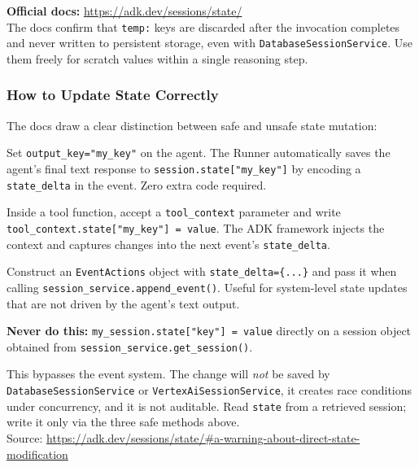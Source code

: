 \documentclass[12pt, a4paper]{article}
\begin{document}
\begin{theorybox}
\begin{notebox}
\textbf{Official docs:} \url{https://adk.dev/sessions/state/}\\
The docs confirm that \texttt{temp:} keys are discarded after the invocation
completes and never written to persistent storage, even with
\texttt{DatabaseSessionService}. Use them freely for scratch values within a
single reasoning step.
\end{notebox}

\subsubsection*{How to Update State Correctly}

The docs draw a clear distinction between safe and unsafe state mutation:

\begin{description}[leftmargin=4cm, style=nextline, font=\bfseries\color{keyterm}]
  \item[output\_key (easiest)] Set \texttt{output\_key="my\_key"} on the agent. The
    Runner automatically saves the agent's final text response to
    \texttt{session.state["my\_key"]} by encoding a \texttt{state\_delta} in the
    event. Zero extra code required.

  \item[ToolContext.state (in tools)] Inside a tool function, accept a
    \texttt{tool\_context} parameter and write
    \texttt{tool\_context.state["my\_key"] = value}. The ADK framework injects the
    context and captures changes into the next event's \texttt{state\_delta}.

  \item[EventActions.state\_delta (manual)] Construct an \texttt{EventActions} object
    with \texttt{state\_delta=\{...\}} and pass it when calling
    \texttt{session\_service.append\_event()}. Useful for system-level state updates
    that are not driven by the agent's text output.
\end{description}

\begin{warnbox}
\textbf{Never do this:}
\texttt{my\_session.state["key"] = value} directly on a session object obtained
from \texttt{session\_service.get\_session()}.

This bypasses the event system. The change will \emph{not} be saved by
\texttt{DatabaseSessionService} or \texttt{VertexAiSessionService}, it creates
race conditions under concurrency, and it is not auditable. Read \texttt{state}
from a retrieved session; write it only via the three safe methods above.\\[2pt]
Source: \url{https://adk.dev/sessions/state/\#a-warning-about-direct-state-modification}
\end{warnbox}


\end{theorybox}
\end{document}
